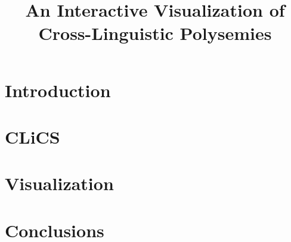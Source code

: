\documentclass[10pt, a4paper]{article}
\title{An Interactive Visualization of Cross-Linguistic Polysemies}
\begin{document}
\maketitleabstract

\section{Introduction}

\section{CLiCS}



\section{Visualization}



\section{Conclusions}






\end{document}
